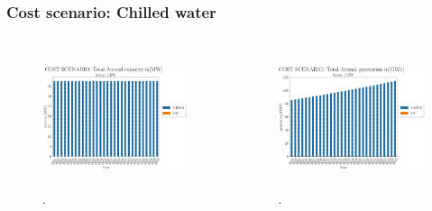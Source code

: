 \begin{frame}
  \frametitle{Cost scenario: Chilled water}
  \begin{columns}
	  \column[t]{5cm}
  		\begin{figure}[htbp!]
    			\begin{center}
      			\includegraphics[height=4cm]{./images/cost scenario_chw_capacity.png}
    			\end{center}
    			\caption{.} 
    			\label{fig:cost-chws-cap}
  		\end{figure}
	\column[t]{5cm}
  		\begin{figure}[htbp!]
   		 \begin{center}
      			\includegraphics[height=4cm]{./images/cost scenario_chw_generation.png}
    			\end{center}
    			\caption{.} 
    			\label{fig:cost-chws-gen}
  			\end{figure}
   \end{columns}
\end{frame}

